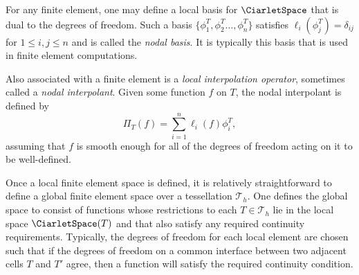 For any finite element, one may define a local basis for
$\CiarletSpace$ that is dual to the degrees of freedom. Such a basis
$\{\phi^T_1,\phi^T_2 \ldots , \phi^T_{n} \}$ satisfies $ \ell_i(
\phi^T_j ) = \delta_{ij} $ for $1 \leqslant i,j \leqslant n $ and is called
the \emph{nodal basis}. It is typically this basis that is used in
finite element computations.

Also associated with a finite element is a \emph{local interpolation
  operator}, sometimes called a \emph{nodal interpolant}. Given some
function $f$ on $T$, the nodal interpolant is defined by
\begin{equation}
  \Pi_T(f) = \sum_{i=1}^{n} \ell_i(f) \phi^T_i,
\end{equation}
assuming that $f$ is smooth enough for all of the degrees of freedom
acting on it to be well-defined.

Once a local finite element space is defined, it is relatively
straightforward to define a global finite element space over a
tessellation $\mathcal{T}_h$.  One defines the global space to consist
of functions whose restrictions to each $T \in \mathcal{T}_h$ lie in
the local space $\CiarletSpace(T)$ and that also satisfy any required
continuity requirements.  Typically, the degrees of freedom for each
local element are chosen such that if the degrees of freedom on a
common interface between two adjacent cells $T$ and $T'$ agree, then a
function will satisfy the required continuity condition.

